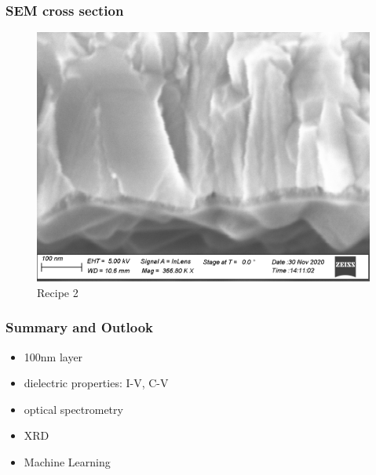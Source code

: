 \documentclass{beamer}
\begin{document}
\begin{frame}
	\frametitle{SEM cross section }
	\begin{figure}
		\centering
		\includegraphics[height=.85\textheight]{Images/buac_cs.png}
		\caption{Recipe 2}
	\end{figure}
\end{frame}

\begin{frame}
	\frametitle{Summary and Outlook}
		\begin{itemize}
			\item 100nm layer
			\item dielectric properties: I-V, C-V
			\item optical spectrometry
			\item XRD
			\item Machine Learning
		\end{itemize}
\end{frame}

\end{document}
